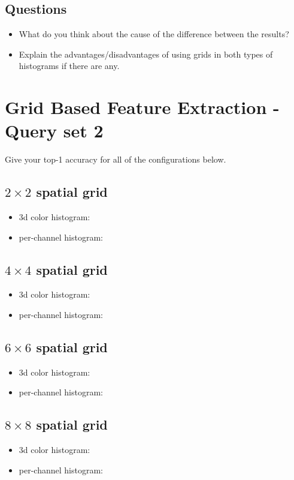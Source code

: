 \documentclass[12pt]{article}
\begin{document}
\subsection{Questions}
\begin{itemize}
\item What do you think about the cause of the difference between the results?
\item Explain the advantages/disadvantages of using grids in both types of histograms if there are any.
\end{itemize}

\section{Grid Based Feature Extraction - Query set 2}
Give your top-1 accuracy for all of the configurations below.

\subsection{$2 \times 2$ spatial grid}
\begin{itemize}
\item 3d color histogram:
\item per-channel histogram:
\end{itemize}

\subsection{$4 \times 4$ spatial grid}
\begin{itemize}
\item 3d color histogram:
\item per-channel histogram:
\end{itemize}

\subsection{$6 \times 6$ spatial grid}
\begin{itemize}
\item 3d color histogram:
\item per-channel histogram:
\end{itemize}

\subsection{$8 \times 8$ spatial grid}
\begin{itemize}
\item 3d color histogram:
\item per-channel histogram:
\end{itemize}
\end{document}
